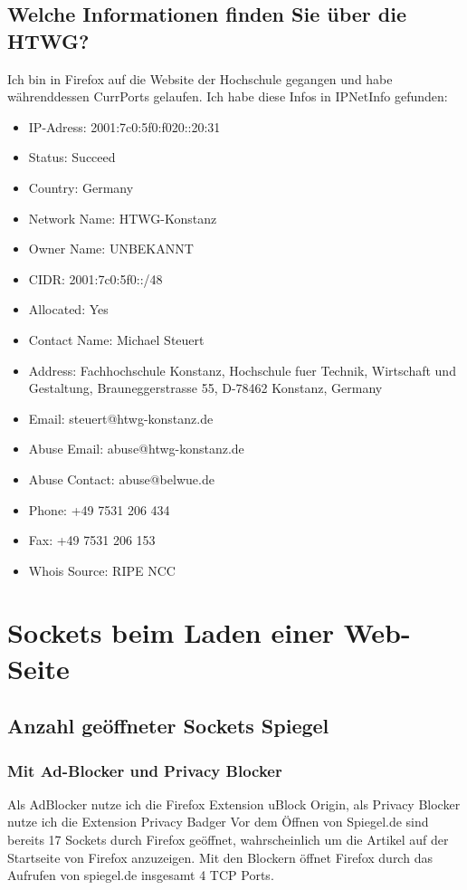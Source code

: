 \documentclass{kdiartcl}
\begin{document}
\subsection{Welche Informationen finden Sie über die HTWG?}
Ich bin in Firefox auf die Website der Hochschule gegangen und habe währenddessen CurrPorts gelaufen. Ich habe diese Infos in IPNetInfo gefunden:
\begin{itemize}
    \item IP-Adress: 2001:7c0:5f0:f020::20:31
    \item Status: Succeed
    \item Country: Germany
    \item Network Name: HTWG-Konstanz
    \item Owner Name: UNBEKANNT
    \item CIDR: 2001:7c0:5f0::/48
    \item Allocated: Yes
    \item Contact Name: Michael Steuert
    \item Address: Fachhochschule Konstanz, Hochschule fuer Technik, Wirtschaft und Gestaltung, Brauneggerstrasse 55, D-78462 Konstanz, Germany
    \item Email: steuert@htwg-konstanz.de
    \item Abuse Email: abuse@htwg-konstanz.de
    \item Abuse Contact: abuse@belwue.de
    \item Phone: +49 7531 206 434
    \item Fax: +49 7531 206 153
    \item Whois Source: RIPE NCC
\end{itemize}		

\section{Sockets beim Laden einer Web-Seite}
\subsection{Anzahl geöffneter Sockets Spiegel}
\subsubsection{Mit Ad-Blocker und Privacy Blocker}
Als AdBlocker nutze ich die Firefox Extension uBlock Origin, als Privacy Blocker nutze ich die Extension Privacy Badger
Vor dem Öffnen von Spiegel.de sind bereits 17 Sockets durch Firefox geöffnet, wahrscheinlich um die Artikel auf der Startseite von Firefox anzuzeigen.
Mit den Blockern öffnet Firefox durch das Aufrufen von spiegel.de insgesamt 4 TCP Ports.
\end{document}
